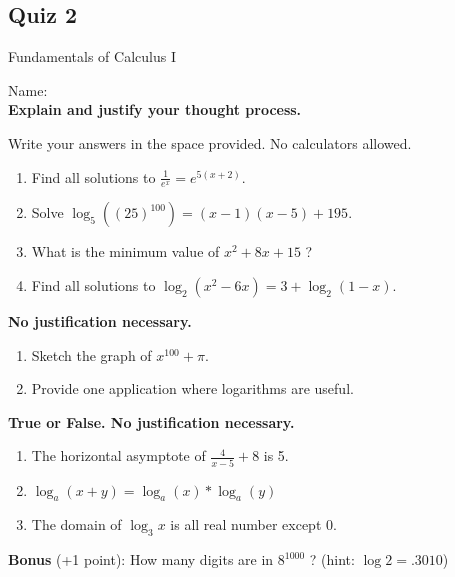 \documentclass[a4paper, 12pt]{article}
\title{}
\date{}
\newcommand{\bt}[1]{\textbf{#1}} %
\begin{document}
\begin{center}
\section*{Quiz 2}
Fundamentals of Calculus I
\end{center}

Name: \underline{\hspace{5cm}} \\

\bt{Explain and justify your thought process.}

Write your answers in the space provided. No calculators allowed.

\begin{enumerate}
    \item Find all solutions to $\frac{1}{e^x} = e^{5(x+2)}$.
    \vspace{6cm}
    \item Solve $\log_5 ((25)^{100}) = (x-1)(x-5) + 195$.
    \vspace{6cm}
    \item What is the minimum value of $x^2 + 8x + 15$ ?
    \vspace{6cm}
    \item Find all solutions to $\log_2 (x^2 - 6x) = 3 + \log_2 (1-x)$.
    \vspace{6cm}
\end{enumerate}


\bt{No justification necessary.}
\begin{enumerate}[resume]
    \item Sketch the graph of $x^{100} + \pi$.
    \vspace{5cm}
    \item Provide one application where logarithms are useful.
    \vspace{5cm}
\end{enumerate}

\bt{True or False. No justification necessary.}
\begin{enumerate}[resume]
    \item \underline{\hspace{1.5cm}} The horizontal asymptote of $\frac{4}{x-5} + 8$ is 5.
    \item \underline{\hspace{1.5cm}} $\log_a (x + y) = \log_a (x) * \log_a (y)$
    \item \underline{\hspace{1.5cm}} The domain of $\log_3 x$  is all real number except 0. \\
\end{enumerate}

\bt{Bonus} (+1 point): How many digits are in $8^{1000}$ ? (hint: $\log 2 = .3010$) 
\end{document}
